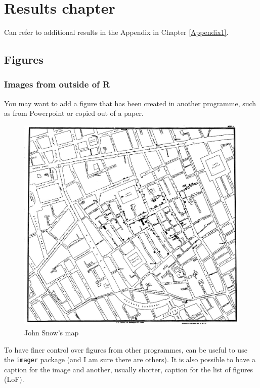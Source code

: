 \documentclass[12pt,]{book}
\begin{document}
\hypertarget{chapter4}{%
\chapter{Results chapter}\label{chapter4}}

Can refer to additional results in the Appendix in Chapter \ref{Appendix1}.

\hypertarget{figures}{%
\section{Figures}\label{figures}}

\hypertarget{images-from-outside-of-r}{%
\subsection{Images from outside of R}\label{images-from-outside-of-r}}

You may want to add a figure that has been created in another programme, such as from Powerpoint or copied out of a paper.

\begin{figure}
\centering
\includegraphics{Figures/1024px-Snow-cholera-map-1.jpg}
\caption{John Snow's map}
\end{figure}

To have finer control over figures from other programmes, can be useful to use the \texttt{imager} package (and I am sure there are others).
It is also possible to have a caption for the image and another, usually shorter, caption for the list of figures (LoF).
\end{document}
